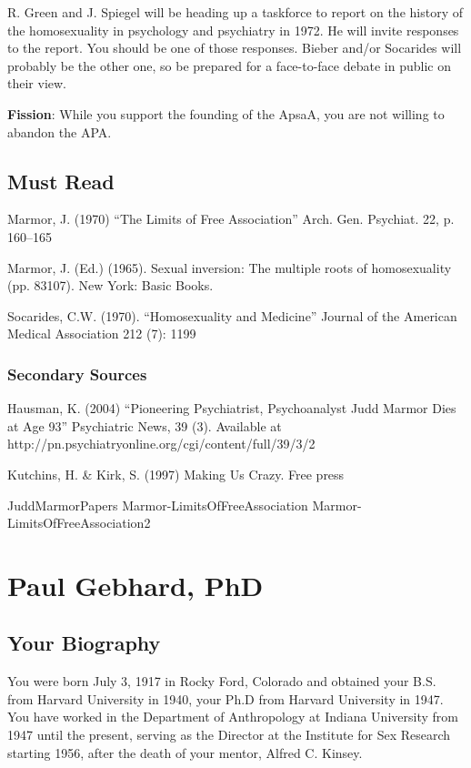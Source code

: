 \begin{refsection}
R. Green and J. Spiegel will be heading up a taskforce to report on the history of the homosexuality in psychology and psychiatry in 1972. He will invite responses to the report. You should be one of those responses. Bieber and\slash or Socarides will probably be the other one, so be prepared for a face-to-face debate in public on their view.

\textbf{Fission}: While you support the founding of the ApsaA, you are not willing to abandon the APA.

\section{Must Read}
\label{mustread}

Marmor, J. (1970) ``The Limits of Free Association'' Arch. Gen. Psychiat. 22, p. 160--165

Marmor, J. (Ed.) (1965). Sexual inversion: The multiple roots of homosexuality (pp. 83107). New York: Basic Books.

Socarides, C.W. (1970). ``Homosexuality and Medicine'' Journal of the American Medical Association 212 (7): 1199

\subsection{Secondary Sources}
\label{secondarysources}

Hausman, K. (2004) ``Pioneering Psychiatrist, Psychoanalyst Judd Marmor Dies at Age 93'' Psychiatric News, 39 (3). Available at http:\slash \slash pn.psychiatryonline.org\slash cgi\slash content\slash full\slash 39\slash 3\slash 2

Kutchins, H. \& Kirk, S. (1997) Making Us Crazy. Free press

JuddMarmorPapers
Marmor-LimitsOfFreeAssociation
Marmor-LimitsOfFreeAssociation2

\chapter{Paul Gebhard, PhD}
\label{paulgebhardphd}

\section{Your Biography}
\label{yourbiography}

You were born July 3, 1917 in Rocky Ford, Colorado and obtained your B.S. from Harvard University in 1940, your Ph.D from Harvard University in 1947. You have worked in the Department of Anthropology at Indiana University from 1947 until the present, serving as the Director at the Institute for Sex Research starting 1956, after the death of your mentor, Alfred C. Kinsey.


\end{refsection}
